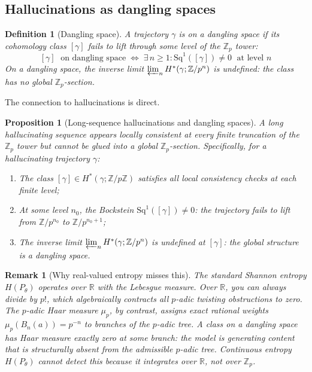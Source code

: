 \documentclass[11pt,a4paper]{article}
\newtheorem{proposition}[theorem]{Proposition}
\newtheorem{definition}[theorem]{Definition}
\newtheorem{remark}[theorem]{Remark}
\begin{document}
\subsection{Hallucinations as dangling spaces}

\begin{definition}[Dangling space]
A trajectory $\gamma$ is on a \emph{dangling space} if its cohomology
class $[\gamma]$ fails to lift through some level of the
$\mathbb{Z}_p$ tower:
\[
  [\gamma] \;\text{ on dangling space}
  \;\iff\;
  \exists\, n \geq 1 : \mathrm{Sq}^1([\gamma]) \neq 0
  \;\text{ at level } n
\]
On a dangling space, the inverse limit $\varprojlim_n H^*(\gamma;\mathbb{Z}/p^n)$
is undefined: the class has no global $\mathbb{Z}_p$-section.
\end{definition}

The connection to hallucinations is direct.

\begin{proposition}[Long-sequence hallucinations and dangling spaces]
\label{prop:dangling}
A long hallucinating sequence appears locally consistent at every
finite truncation of the $\mathbb{Z}_p$ tower but cannot be glued
into a global $\mathbb{Z}_p$-section.
Specifically, for a hallucinating trajectory $\gamma$:
\begin{enumerate}[label=(\roman*)]
  \item The class $[\gamma] \in H^*(\gamma;\mathbb{Z}/p\mathbb{Z})$
        satisfies all local consistency checks at each finite level;
  \item At some level $n_0$, the Bockstein $\mathrm{Sq}^1([\gamma]) \neq 0$:
        the trajectory fails to lift from $\mathbb{Z}/p^{n_0}$ to
        $\mathbb{Z}/p^{n_0+1}$;
  \item The inverse limit $\varprojlim_n H^*(\gamma;\mathbb{Z}/p^n)$
        is undefined at $[\gamma]$: the global structure is a
        dangling space.
\end{enumerate}
\end{proposition}

\begin{remark}[Why real-valued entropy misses this]
The standard Shannon entropy $H(P_\theta)$ operates over
$\mathbb{R}$ with the Lebesgue measure.
Over $\mathbb{R}$, you can always divide by $p!$, which
algebraically contracts all $p$-adic twisting obstructions to zero.
The $p$-adic Haar measure $\mu_p$, by contrast, assigns exact
rational weights $\mu_p(B_n(a)) = p^{-n}$ to branches of the
$p$-adic tree.
A class on a dangling space has Haar measure exactly zero at
some branch: the model is generating content that is structurally
absent from the admissible $p$-adic tree.
Continuous entropy $H(P_\theta)$ cannot detect this because it
integrates over $\mathbb{R}$, not over $\mathbb{Z}_p$.
\end{remark}
\end{document}
